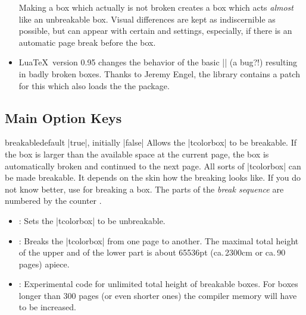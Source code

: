 \begin{itemize}
  Making a box  which actually is not broken creates
  a box which acts \emph{almost} like an unbreakable box. Visual differences
  are kept as indiscernible as possible, but can appear with certain
   and  settings, especially, if there
  is an automatic page break before the box.
\item{}
  Lua\TeX\ version 0.95 changes the behavior of the basic |\vsplit| (a bug?!)
  resulting in badly broken boxes. Thanks to Jeremy Engel,
  the  library contains a patch for this which
  also loads the the  package.
\end{itemize}


\clearpage
\subsection{Main Option Keys}
\begin{docTcbKey}[][doc updated=2017-02-01]{breakable}{}{default |true|, initially |false|}
  Allows the |tcolorbox| to be breakable. If the box is larger than the
  available space at the current page, the box is automatically broken
  and continued to the next page. All sorts of |tcolorbox| can be made
  breakable. It depends on the skin how the breaking looks like.
  If you do not know better, use  for breaking a box.
  The parts of the \emph{break sequence} are numbered
  by the counter .
  \begin{itemize}
  \item{}: Sets the |tcolorbox| to be unbreakable.
  \item{}: Breaks the |tcolorbox| from one page to another.
    The maximal total height of the upper and of the lower part is
    about 65536pt (ca.\,2300cm or ca.\,90 pages) apiece.
  \item{}: Experimental code for unlimited total height of
    breakable boxes.
    For boxes longer than 300 pages (or even shorter ones) the
    compiler memory will have to be increased.
  \end{itemize}

\begin{dispListing}

\begin{tcolorbox}[breakable,title=My breakable box]
\lipsum[1-6]
\end{tcolorbox}
\end{dispListing}
\end{docTcbKey}
{\tcbusetemp}


